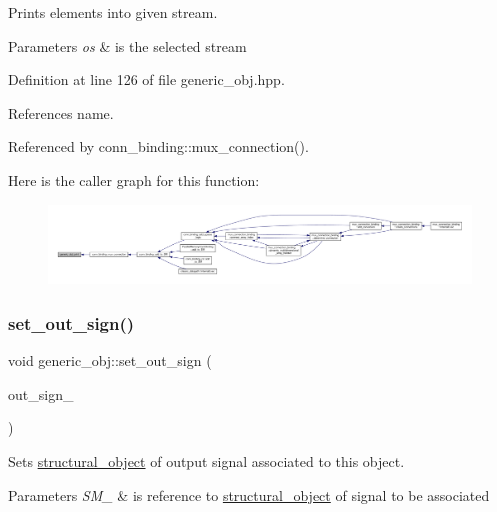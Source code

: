 Prints elements into given stream. 


\begin{DoxyParams}{Parameters}
{\em os} & is the selected stream \\
\hline
\end{DoxyParams}


Definition at line 126 of file generic\+\_\+obj.\+hpp.



References name.



Referenced by conn\+\_\+binding\+::mux\+\_\+connection().

Here is the caller graph for this function\+:
\nopagebreak
\begin{figure}[H]
\begin{center}
\leavevmode
\includegraphics[width=350pt]{d1/d64/classgeneric__obj_ad1dbe7ec4abc9bf55d093b0468899a9e_icgraph}
\end{center}
\end{figure}
\mbox{\label{classgeneric__obj_a08d8b6f56118e18065695da3d9a5b969}} 
\subsubsection{\texorpdfstring{set\+\_\+out\+\_\+sign()}{set\_out\_sign()}}
{\footnotesize\ttfamily void generic\+\_\+obj\+::set\+\_\+out\+\_\+sign (\begin{DoxyParamCaption}\item[{const \hyperlink{structural__objects_8hpp_a8ea5f8cc50ab8f4c31e2751074ff60b2}{structural\+\_\+object\+Ref} \&}]{out\+\_\+sign\+\_\+ }\end{DoxyParamCaption})\hspace{0.3cm}{\ttfamily [inline]}}



Sets \hyperlink{classstructural__object}{structural\+\_\+object} of output signal associated to this object. 


\begin{DoxyParams}{Parameters}
{\em S\+M\+\_\+} & is reference to \hyperlink{classstructural__object}{structural\+\_\+object} of signal to be associated \\
\hline
\end{DoxyParams}


